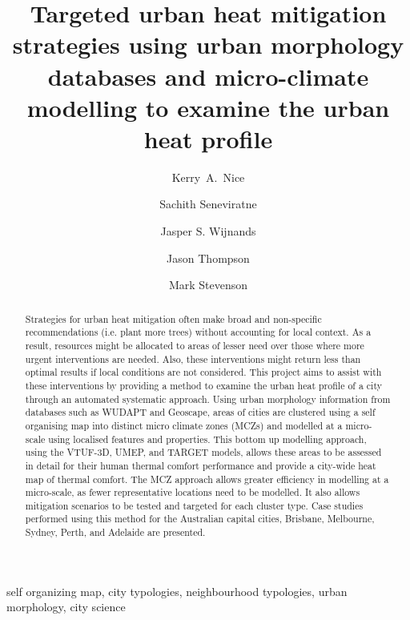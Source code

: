 \documentclass[final,3p,times,authoryear]{elsarticle}
\begin{document}

\title{Targeted urban heat mitigation strategies using urban morphology databases and micro-climate modelling to examine the urban heat profile}

\author[melb]{Kerry~A.~Nice}
\author[melb]{Sachith Seneviratne}
\author[melb]{Jasper S. Wijnands}
\author[melb]{Jason Thompson}
\author[melb,eng]{Mark Stevenson}
\address[melb]{Transport, Health, and Urban Design Hub, Faculty of Architecture, Building, and Planning, University of Melbourne, Australia.}
\address[eng]{Melbourne School of Engineering; and Melbourne School of Population and Global Health, University of Melbourne, Australia.}







\begin{abstract}
Strategies for urban heat mitigation often make broad and non-specific recommendations (i.e. plant more trees) without accounting for local context. As a result, resources might be allocated to areas of lesser need over those where more urgent interventions are needed. Also, these interventions might return less than optimal results if local conditions are not considered. This project aims to assist with these interventions by providing a method to examine the urban heat profile of a city through an automated systematic approach. Using urban morphology information from databases such as WUDAPT and Geoscape, areas of cities are clustered using a self organising map into distinct micro climate zones (MCZs) and modelled at a micro-scale using localised features and properties. This bottom up modelling approach, using the VTUF-3D, UMEP, and TARGET models, allows these areas to be assessed in detail for their human thermal comfort performance and provide a city-wide heat map of thermal comfort. The MCZ approach allows greater efficiency in modelling at a micro-scale, as fewer representative locations need to be modelled. It also allows mitigation scenarios to be tested and targeted for each cluster type. Case studies performed using this method for the Australian capital cities, Brisbane, Melbourne, Sydney, Perth, and Adelaide are presented.
\end{abstract}

\begin{keyword}
self organizing map\sep 
city typologies\sep
neighbourhood typologies\sep
urban morphology\sep
city science
\end{keyword}
\end{document}
